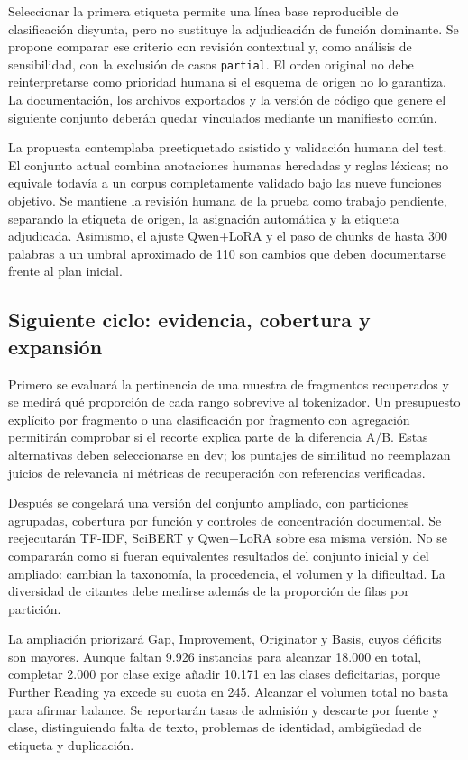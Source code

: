 \documentclass[10pt,a4paper,twocolumn]{article}
\begin{document}
Seleccionar la primera etiqueta permite una línea base reproducible de clasificación disyunta, pero no sustituye la adjudicación de función dominante. Se propone comparar ese criterio con revisión contextual y, como análisis de sensibilidad, con la exclusión de casos \texttt{partial}. El orden original no debe reinterpretarse como prioridad humana si el esquema de origen no lo garantiza. La documentación, los archivos exportados y la versión de código que genere el siguiente conjunto deberán quedar vinculados mediante un manifiesto común.

La propuesta contemplaba preetiquetado asistido y validación humana del test. El conjunto actual combina anotaciones humanas heredadas y reglas léxicas; no equivale todavía a un corpus completamente validado bajo las nueve funciones objetivo. Se mantiene la revisión humana de la prueba como trabajo pendiente, separando la etiqueta de origen, la asignación automática y la etiqueta adjudicada. Asimismo, el ajuste Qwen+LoRA y el paso de chunks de hasta 300 palabras a un umbral aproximado de 110 son cambios que deben documentarse frente al plan inicial.

\subsection{Siguiente ciclo: evidencia, cobertura y expansión}
Primero se evaluará la pertinencia de una muestra de fragmentos recuperados y se medirá qué proporción de cada rango sobrevive al tokenizador. Un presupuesto explícito por fragmento o una clasificación por fragmento con agregación permitirán comprobar si el recorte explica parte de la diferencia A/B. Estas alternativas deben seleccionarse en dev; los puntajes de similitud no reemplazan juicios de relevancia ni métricas de recuperación con referencias verificadas.

Después se congelará una versión del conjunto ampliado, con particiones agrupadas, cobertura por función y controles de concentración documental. Se reejecutarán TF-IDF, SciBERT y Qwen+LoRA sobre esa misma versión. No se compararán como si fueran equivalentes resultados del conjunto inicial y del ampliado: cambian la taxonomía, la procedencia, el volumen y la dificultad. La diversidad de citantes debe medirse además de la proporción de filas por partición.

La ampliación priorizará Gap, Improvement, Originator y Basis, cuyos déficits son mayores. Aunque faltan 9.926 instancias para alcanzar 18.000 en total, completar 2.000 por clase exige añadir 10.171 en las clases deficitarias, porque Further Reading ya excede su cuota en 245. Alcanzar el volumen total no basta para afirmar balance. Se reportarán tasas de admisión y descarte por fuente y clase, distinguiendo falta de texto, problemas de identidad, ambigüedad de etiqueta y duplicación.
\end{document}
